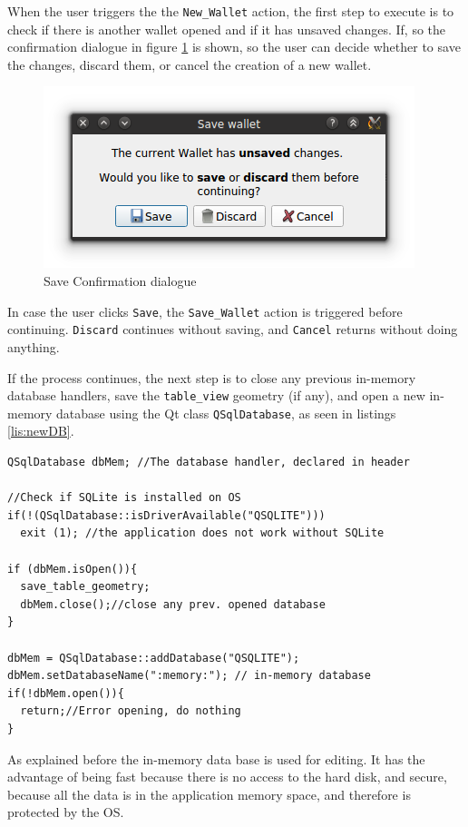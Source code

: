 When the user triggers the the \texttt{New\_Wallet} action, the first step to execute is to check if there is another wallet opened and if it has unsaved changes. If, so the confirmation dialogue in figure \ref{fig:confSave} is shown, so the user can decide whether to save the changes, discard them, or cancel the creation of a new wallet.
\begin{figure}[htb]
  \centering
  \captionsetup{justification=centering}
  \centerline{\includegraphics[width=0.6\columnwidth]{chapters/figures/development/confSave.png}}
  \caption{Save Confirmation dialogue}
  \label{fig:confSave}
\end{figure}

In case the user clicks \texttt{Save}, the \texttt{Save\_Wallet} action is triggered before continuing. \texttt{Discard} continues without saving, and \texttt{Cancel} returns without doing anything.

If the process continues, the next step is to close any previous in-memory database handlers, save the \texttt{table\_view} geometry (if any), and open a new in-memory database using the Qt class \texttt{QSqlDatabase}, as seen in listings \ref{lis:newDB}.

\begin{lstlisting}[style=customc, float=htb, caption={New in memory database}, label = {lis:newDB}]
QSqlDatabase dbMem; //The database handler, declared in header 

//Check if SQLite is installed on OS
if(!(QSqlDatabase::isDriverAvailable("QSQLITE")))
  exit (1); //the application does not work without SQLite

if (dbMem.isOpen()){ 
  save_table_geometry;
  dbMem.close();//close any prev. opened database
}

dbMem = QSqlDatabase::addDatabase("QSQLITE");
dbMem.setDatabaseName(":memory:"); // in-memory database
if(!dbMem.open()){
  return;//Error opening, do nothing
}
\end{lstlisting}

As explained before the in-memory data base is used for editing. It has the advantage of being fast because there is no access to the hard disk, and secure, because all the data is in the application memory space, and therefore is protected by the OS.


